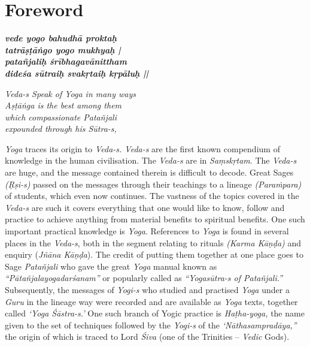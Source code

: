 \thispagestyle{empty}

\chapter*{Foreword}

\begin{shloka}
\centering
\noindent
 \emph{\textbf{vede yogo bahudhā proktaḥ}}\\
 \emph{\textbf{tatrāṣṭāṅgo yogo mukhyaḥ |}}\\
 \emph{\textbf{patañjaliḥ śrībhagavānittham}}\\
 \emph{\textbf{dideśa sūtraiḥ svakṛtaiḥ kṛpāluḥ ||}}
\smallskip

\textit{Veda-s Speak of Yoga in many ways}\\
\textit{Aṣṭāṅga is the best among them}\\
\textit{which compassionate Patañjali}\\
\textit{expounded through his Sūtra-s,}
\end{shloka}

\noindent \textit{Yoga} traces its origin to \textit{Veda-s. Veda-s} are the first known compendium of knowledge in the human civilisation.  The \textit{Veda-s} are in \textit{Saṃskṛtam}. The \textit{Veda-s} are huge, and the message contained therein is difficult to decode. Great Sages \textit{(Ṛṣi-s)} passed on the messages through their teachings to a lineage \textit{(Paraṁpara)} of students, which even now continues. The vastness of the topics covered in the \textit{Veda-s} are such it covers everything that one would like to know, follow and practice to achieve anything from material benefits to spiritual benefits. One such important practical knowledge is \textit{Yoga}.  References to \textit{Yoga} is found in several places in the \textit{Veda-s}, both in the segment relating to rituals \textit{(Karma Kāṇḍa)} and enquiry (\textit{Jñāna Kāṇḍa}). The credit of putting them together at one place goes to Sage \textit{Patañjali} who gave the great \textit{Yoga} manual known as \textit{“Pātañjalayogadarśanam”} or popularly called as \textit{“Yogasūtra-s of Patañjali.”} Subsequently, the messages of \textit{Yogi-s} who studied and practised \textit{Yoga} under a \textit{Guru} in the lineage way were recorded and are available as \textit{Yoga} texts, together called \textit{‘Yoga Śāstra-s.’}  One such branch of Yogic practice is \textit{Haṭha-yoga,} the name given to the set of techniques followed by the \textit{Yogi-s} of the \textit{‘Nāthasampradāya,”} the origin of which is traced to Lord \textit{Śiva} (one of the Trinities – \textit{Vedic} Gods).

